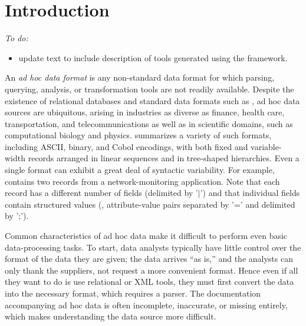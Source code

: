 \section{Introduction}
\label{sec:intro}

{\em
To do:
\begin{itemize}
\item update text to include description of tools generated using the framework.
\end{itemize}
}

An {\em ad hoc data format} is any non-standard data format for which
parsing, querying, analysis, or transformation tools are not readily
available.  Despite the existence of relational databases and standard
data formats such as \xml{}, ad hoc data sources are ubiquitous,
arising in industries as diverse as finance, health care,
transportation, and telecommunications as well as in scientific
domains, such as computational biology and physics.
 summarizes a variety of such formats,
including ASCII, binary, and Cobol encodings, with both fixed and
variable-width records arranged in linear sequences and in tree-shaped
hierarchies.  Even a single format can exhibit a great deal of
syntactic variability.  For example, 
contains two records from a network-monitoring application.  Note that
each record has a different number of fields (delimited by '$|$') and
that individual fields contain structured values (\eg{},
attribute-value pairs separated by '=' and delimited by ';').

Common characteristics of ad hoc data make it difficult to 
perform even basic data-processing tasks.  To start, data analysts
typically have little control over the format of the data they are
given;  the data arrives ``as is,'' and the analysts
can only thank the suppliers, not request a more
convenient format.  Hence even if all they want to do is use 
relational or XML tools, they must first convert the data into the
necessary format, which requires a parser.  
The documentation accompanying ad hoc data is often incomplete,
inaccurate, or missing entirely, which makes understanding the data
source more difficult.


